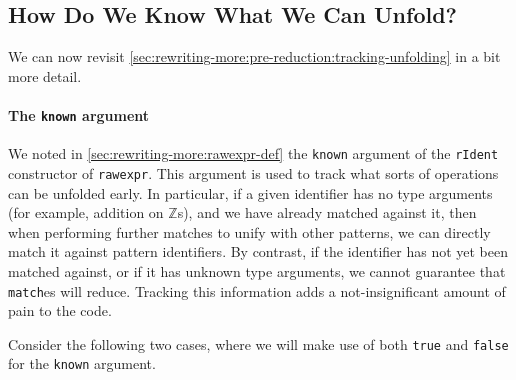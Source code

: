 
\subsection{How Do We Know What We Can Unfold?}\label{sec:rewriting-more:pre-reduction-again:tracking-unfolding}
We can now revisit \autoref{sec:rewriting-more:pre-reduction:tracking-unfolding} in a bit more detail.

\paragraph{The \texttt{known} argument}\label{sec:rewriting-more:rIdent-known}
We noted in \autoref{sec:rewriting-more:rawexpr-def} the \texttt{known} argument of the \texttt{rIdent} constructor of \texttt{rawexpr}.
This argument is used to track what sorts of operations can be unfolded early.
In particular, if a given identifier has no type arguments (for example, addition on $\mathbb{Z}$s), and we have already matched against it, then when performing further matches to unify with other patterns, we can directly match it against pattern identifiers.
By contrast, if the identifier has not yet been matched against, or if it has unknown type arguments, we cannot guarantee that \texttt{match}es will reduce.
Tracking this information adds a not-insignificant amount of pain to the code.

Consider the following two cases, where we will make use of both \texttt{true} and \texttt{false} for the \texttt{known} argument.

